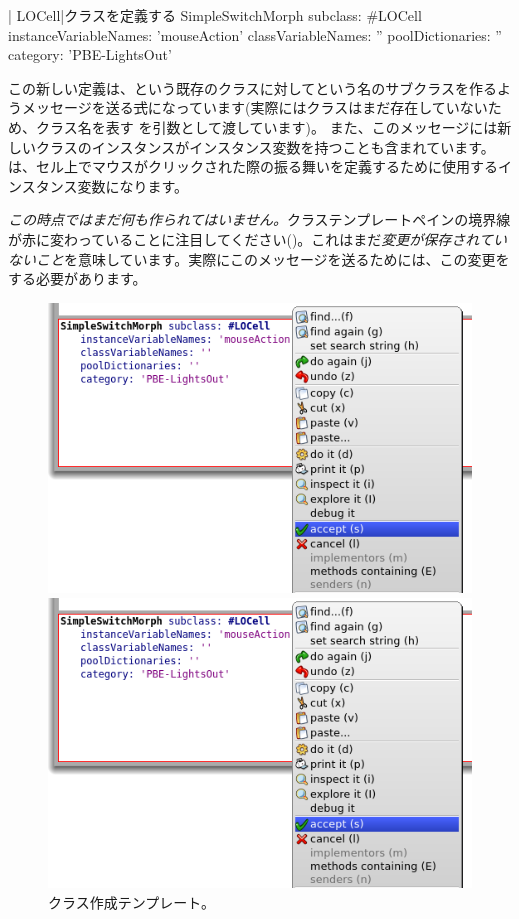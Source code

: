 \documentclass[a4paper,10pt,twoside]{book}
\begin{document}
\begin{classdef}[firstClassDef]{\ct| LOCell|クラスを定義する}
SimpleSwitchMorph subclass: #LOCell
   instanceVariableNames: 'mouseAction'
   classVariableNames: ''
   poolDictionaries: ''
   category: 'PBE-LightsOut'
\end{classdef}

この新しい定義は、という既存のクラスに対してという名のサブクラスを作るようメッセージを送る\st 式になっています(実際にはクラスはまだ存在していないため、クラス名を表す を引数として渡しています)。
また、このメッセージには新しいクラスのインスタンスがインスタンス変数を持つことも含まれています。は、セル上でマウスがクリックされた際の振る舞いを定義するために使用するインスタンス変数になります。

\emph{この時点ではまだ何も作られてはいません。}クラステンプレートペインの境界線が赤に変わっていることに注目してください()。これはまだ\emph{変更が保存されていないこと}を意味しています。実際にこのメッセージを送るためには、この変更をする必要があります。

\begin{figure}[h!t]
\ifluluelse
	{\centerline {\includegraphics[width=\textwidth]{AcceptClassDef}}}
	{\centerline {\includegraphics[scale=0.7]{AcceptClassDef}}}
\caption{クラス作成テンプレート。
}
\end{figure}
\end{document}
